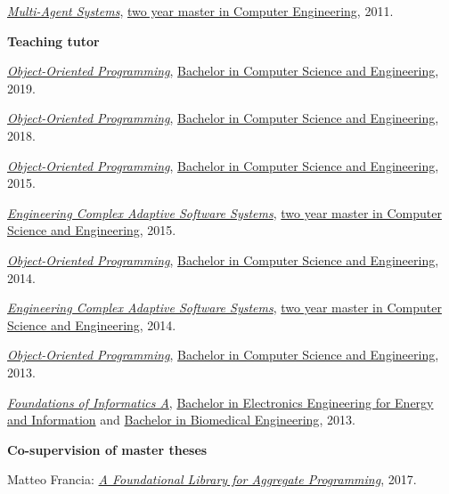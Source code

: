 \begin{outerlist}
\begin{innerlist}
      \item \href{http://archive.fo/nnsBl/}{\textit{Multi-Agent Systems}}, \href{http://archive.fo/qDVq3}{two year master in Computer Engineering}, 2011.
    \end{innerlist}
\item[] \textbf{Teaching tutor} %
    \begin{innerlist}
      \item \href{http://archive.fo/JtEDW}{\textit{Object-Oriented Programming}}, \href{http://archive.fo/UM5wl}{Bachelor in Computer Science and Engineering}, 2019.
      \item \href{http://archive.fo/srdtN}{\textit{Object-Oriented Programming}}, \href{http://archive.fo/UM5wl}{Bachelor in Computer Science and Engineering}, 2018.
      \item \href{http://archive.fo/puTDG}{\textit{Object-Oriented Programming}}, \href{http://archive.fo/UM5wl}{Bachelor in Computer Science and Engineering}, 2015.
      \item \href{http://archive.fo/5LhhW}{\textit{Engineering Complex Adaptive Software Systems}}, \href{http://archive.fo/toz5c}{two year master in Computer Science and Engineering}, 2015.
      \item \href{http://archive.fo/8jzEp}{\textit{Object-Oriented Programming}}, \href{http://archive.fo/UM5wl}{Bachelor in Computer Science and Engineering}, 2014.
      \item \href{http://archive.fo/h8JCD}{\textit{Engineering Complex Adaptive Software Systems}}, \href{http://archive.fo/toz5c}{two year master in Computer Science and Engineering}, 2014.
      \item \href{http://archive.fo/0Gr16}{\textit{Object-Oriented Programming}}, \href{http://archive.fo/UM5wl}{Bachelor in Computer Science and Engineering}, 2013.
      \item \href{http://archive.fo/XZFR0}{\textit{Foundations of Informatics A}}, \href{http://archive.fo/30rN0}{Bachelor in Electronics Engineering for Energy and Information} and \href{http://archive.fo/jW52L}{Bachelor in Biomedical Engineering}, 2013.
    \end{innerlist}
\item[] \textbf{Co-supervision of master theses} %
    \begin{innerlist}
      \item Matteo Francia: \href{http://amslaurea.unibo.it/13090/}{\textit{A Foundational Library for Aggregate Programming}}, 2017.

\end{innerlist}
\end{outerlist}
